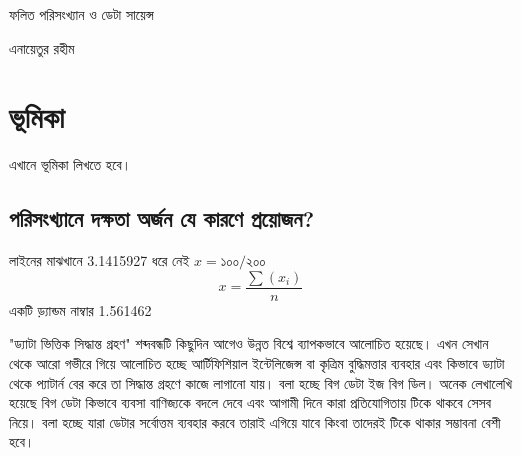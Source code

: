 \documentclass[11pt, twoside, openright, a4paper,xetex]{book}\usepackage[]{graphicx}\usepackage[]{color}
\begin{document}


%

\begin{titlepage}
	\Huge{ফলিত পরিসংখ্যান ও ডেটা সায়েন্স}
	
	\vspace{1in}
	
	\large{এনায়েতুর রহীম}
\end{titlepage}

\resetbengalipage
\bengalipageplainalpha
\tableofcontents
\clearpage
\resetbengalipage
\bengalipagefancynumber
\fancyhead[LO,RE]{\sl\nouppercase\leftmark} %
\fancyhead[LE,RO]{\sl\nouppercase\rightmark} %



\chapter{ভূমিকা}
এখানে ভূমিকা লিখতে হবে।

\section{পরিসংখ্যানে দক্ষতা অর্জন যে কারণে প্রয়োজন?}

লাইনের মাঝখানে  3.1415927  ধরে নেই $x=১০০ / ২০০$
 \[
 x = \frac{\sum(x_i)}{n} 
 \]
 একটি ড়্যান্ডম নাম্বার  1.561462


"ড্যাটা ভিত্তিক সিদ্ধান্ত গ্রহণ" শব্দবন্ধটি কিছুদিন আগেও উন্নত বিশ্বে ব্যাপকভাবে আলোচিত হয়েছে। এখন সেখান থেকে আরো গভীরে গিয়ে আলোচিত হচ্ছে আর্টিফিশিয়াল ইন্টেলিজেন্স বা কৃত্রিম বুদ্ধিমত্তার ব্যবহার এবং কিভাবে ড্যাটা থেকে প্যাটার্ন বের করে তা সিদ্ধান্ত গ্রহণে কাজে লাগানো যায়। বলা হচ্ছে বিগ ডেটা ইজ বিগ ডিল। অনেক লেখালেখি হয়েছে বিগ ডেটা কিভাবে ব্যবসা বাণিজ্যকে বদলে দেবে এবং আগামী দিনে কারা প্রতিযোগিতায় টিকে থাকবে সেসব নিয়ে। বলা হচ্ছে যারা ডেটার সর্বোত্তম ব্যবহার করবে তারাই এগিয়ে যাবে কিংবা তাদেরই টিকে থাকার সম্ভাবনা বেশী হবে।
\end{document}
